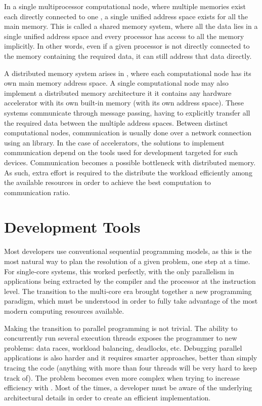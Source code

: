 \documentclass[../thesis]{subfiles}
\begin{document}
		In a single multiprocessor computational node, where multiple memories exist each directly connected to one \cpu, a single unified address space exists for all the main memory. This is called a shared memory system, where all the data lies in a single unified address space and every processor has access to all the memory implicitly. In other words, even if a given processor is not directly connected to the memory containing the required data, it can still address that data directly.

		A distributed memory system arises in \hetplats, where each computational node has its own main memory address space. A single computational node may also implement a distributed memory architecture it it contains any hardware accelerator with its own built-in memory (with its own address space). These systems communicate through message passing, having to explicitly transfer all the required data between the multiple address spaces. Between distinct computational nodes, communication is usually done over a network connection using an \mpi library. In the case of accelerators, the solutions to implement communication depend on the tools used for development targeted for such devices. Communication becomes a possible bottleneck with distributed memory. As such, extra effort is required to the distribute the workload efficiently among the available resources in order to achieve the best computation to communication ratio.

		\section{Development Tools}
		Most developers use conventional sequential programming models, as this is the most natural way to plan the resolution of a given problem, one step at a time. For single-core systems, this worked perfectly, with the only parallelism in applications being extracted by the compiler and the processor at the instruction level. The transition to the multi-core era brought together a new programming paradigm, which must be understood in order to fully take advantage of the most modern computing resources available.

		Making the transition to parallel programming is not trivial. The ability to concurrently run several execution threads exposes the programmer to new problems: data races, workload balancing, deadlocks, etc. Debugging parallel applications is also harder and it requires smarter approaches, better than simply tracing the code (anything with more than four threads will be very hard to keep track of). The problem becomes even more complex when trying to increase efficiency with \hetplats. Most of the times, a developer must be aware of the underlying architectural details in order to create an efficient implementation.
\end{document}
